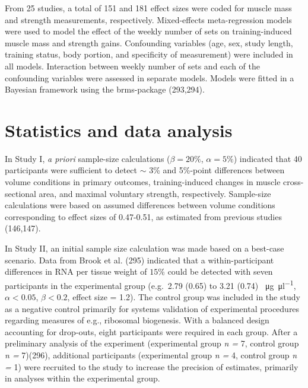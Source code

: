 \documentclass[twoside,10pt]{gihclass} %
\begin{document}
From 25 studies, a total of 151 and 181 effect sizes were coded for muscle mass and strength measurements, respectively. Mixed-effects meta-regression models were used to model the effect of the weekly number of sets on training-induced muscle mass and strength gains.
Confounding variables (age, sex, study length, training status, body portion, and specificity of measurement) were included in all models. Interaction between weekly number of sets and each of the confounding variables were assessed in separate models.
Models were fitted in a Bayesian framework using the brms-package
(293,294).

\hypertarget{statistics-and-data-analysis}{%
\section{Statistics and data analysis}\label{statistics-and-data-analysis}}

In Study I, \emph{a priori} sample-size calculations (\(\beta=20\%\), \(\alpha=5\%\)) indicated that 40 participants were sufficient to detect \(\sim\) 3\% and 5\%-point differences between volume conditions in primary outcomes, training-induced changes in muscle cross-sectional area, and maximal voluntary strength, respectively. Sample-size calculations were based on assumed differences between volume conditions corresponding to effect sizes of 0.47-0.51, as estimated from previous studies (146,147).

In Study II, an initial sample size calculation was made based on a best-case scenario. Data from Brook et al. (295) indicated that a within-participant differences in RNA per tissue weight of \(15\%\) could be detected with seven participants in the experimental group (e.g.~2.79 (0.65) to 3.21 (0.74) \SI{}{\micro\gram\per\micro\litre}, \(\alpha<0.05\), \(\beta<0.2\), effect size = 1.2). The control group was included in the study as a negative control primarily for systems validation of experimental procedures regarding measures of e.g., ribosomal biogenesis. With a balanced design accounting for drop-outs, eight participants were required in each group. After a preliminary analysis of the experiment (experimental group \emph{n = }7, control group \emph{n = }7)(296), additional participants (experimental group \emph{n =} 4, control group \emph{n = }1) were recruited to the study to increase the precision of estimates, primarily in analyses within the experimental group.
\end{document}
